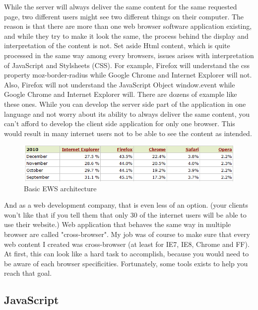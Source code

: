 While the server will always deliver the same content for the same requested page, two different users might see two different things on their computer. 
The reason is that there are more than one web browser software application existing, and while they try to make it look the same, the process behind the display and interpretation of the content is not. Set aside Html content, which is quite processed in the same way among every browsers, issues arises with interpretation of
JavaScript and Stylsheets (CSS). For example, Firefox will understand the css property moz-border-radius while Google Chrome and Internet Explorer will not. Also, Firefox will not understand the JavaScript Object window.event while Google Chrome and Internet Explorer will. There are dozens of example like these ones.
While you can develop the server side part of the application in one language and not worry about its ability to always deliver the same content, you can't afford to develop the client side application for only one browser. This would result in many internet users not to be able to see the content as intended.
\begin{figure}[!ht]
\centering
\includegraphics[width=.55\textwidth]{img/browser_statistics.png}
\caption{Basic EWS architecture }
\label{figure:Market Share of Web Browser}
\end{figure}
And as a web development company, that is even less of an option. (your clients won't like that if you tell them that only 30 of the internet users will be able to use their website.)
Web application that behaves the same way in multiple browser are called "cross-browser". 
My job was of course to make sure that every web content I created was cross-browser (at least for IE7, IE8, Chrome and FF).
At first, this can look like a hard task to accomplish, because you would need to be aware of each browser specificities. Fortunately, some tools exists to help you reach that goal.

\subsection{JavaScript}

